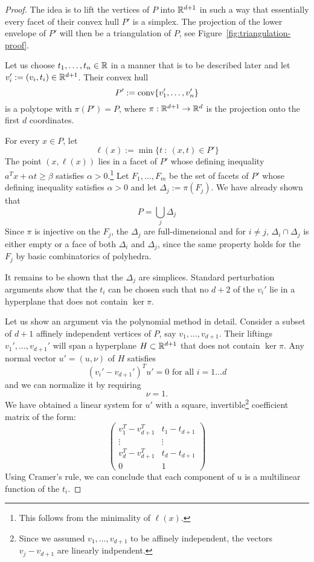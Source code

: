 \begin{proof}
  The idea is to lift the vertices of $P$ into $\mathbb{R}^{d+1}$ in such a way
  that essentially every facet of their convex hull $P'$ is a simplex.
  The projection of the lower envelope of $P'$ will then be a triangulation of $P$,
  see Figure~\ref{fig:triangulation-proof}.

  Let us choose $t_1, \ldots, t_n \in \mathbb{R}$ in a manner that is to be described later
  and let $v_i' := (v_i, t_i) \in \mathbb{R}^{d + 1}$.
  Their convex hull
  \[
    P' := \operatorname{conv}\{v_1',\ldots,v_n'\}
  \]
  is a polytope with $\pi(P') = P$,
  where $\pi:\mathbb{R}^{d+1} \to \mathbb{R}^d$ is the projection onto the first $d$ coordinates.

  For every $x \in P$, let
  \[
    \ell(x) := \min\{ t ~:~ (x,t) \in P' \}
  \]
  The point $(x, \ell(x))$ lies in a facet of $P'$
  whose defining inequality $a^Tx + \alpha t \geq \beta$ satisfies $\alpha > 0$.\footnote{This follows
  from the minimality of $\ell(x)$.}
  Let $F_1,\ldots,F_m$ be the set of facets of $P'$ whose defining inequality satisfies $\alpha > 0$
  and let $\Delta_j := \pi(F_j)$.
  We have already shown that
  \[
    P = \bigcup_j \Delta_j
  \]
  Since $\pi$ is injective on the $F_j$, the $\Delta_j$ are full-dimensional
  and for $i \neq j$, $\Delta_i \cap \Delta_j$ is either empty or a face of both $\Delta_i$ and $\Delta_j$,
  since the same property holds for the $F_j$ by basic combinatorics of polyhedra.

  It remains to be shown that the $\Delta_j$ are simplices.
  Standard perturbation arguments show that the $t_i$ can be chosen such that no $d+2$ of the $v_i'$ lie in a hyperplane that does not contain $\ker \pi$.

  Let us show an argument via the polynomial method in detail.
  Consider a subset of $d+1$ affinely independent vertices of $P$, say $v_1, \ldots, v_{d+1}$.
  Their liftings $v_1', \ldots, v_{d+1}'$ will span a hyperplane $H \subset \mathbb{R}^{d+1}$ that does not contain $\ker \pi$.
  Any normal vector $u' = (u,\nu)$ of $H$ satisfies
  \[
    (v_i' - v_{d+1}')^T u' = 0 \text{ for all } i = 1 \ldots d
  \]
  and we can normalize it by requiring
  \[
    \nu = 1.
  \]
  We have obtained a linear system for $u'$ with a square, invertible\footnote{%
  Since we assumed $v_1, \ldots, v_{d+1}$ to be affinely independent, the vectors $v_j - v_{d+1}$ are linearly indpendent.}
  coefficient matrix of the form:
  \[
    \begin{pmatrix}
      v_1^T - v_{d+1}^T & t_1 - t_{d+1} \\
      \vdots & \vdots \\
      v_d^T - v_{d+1}^T & t_d - t_{d+1} \\
      0 & 1
    \end{pmatrix}
  \]
  Using Cramer's rule, we can conclude that each component of $u$ is a multilinear function of the $t_i$.


\end{proof}
